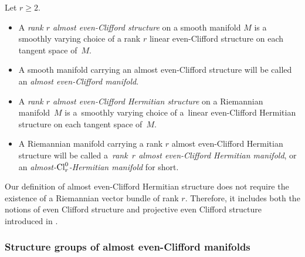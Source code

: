 \documentclass[pdftex]{sigma}
\numberwithin{equation}{section}
\begin{document}
\begin{Definition} Let $r\geq 2$.
\begin{itemize}\itemsep=0pt
 \item A {\em rank $r$ almost even-Clifford structure} on a smooth manifold $M$ is a smoothly varying choice of a rank $r$ linear even-Clif\/ford structure on each tangent space of~$M$.

\item A smooth manifold carrying an almost even-Clif\/ford structure will be called an {\em almost even-Clifford manifold}.

\item A {\em rank $r$ almost even-Clifford Hermitian structure} on a Riemannian manifold~$M$ is \linebreak a~smoothly varying choice of a~linear even-Clif\/ford Hermitian structure on each tangent space of~$M$.

\item A Riemannian manifold carrying a rank $r$ almost even-Clif\/ford Hermitian structure will be called a~{\em rank~$r$ almost even-Clifford Hermitian manifold}, or an {\em almost-${\rm Cl}_r^0$-Hermitian manifold} for short.
\end{itemize}
\end{Definition}

\begin{Remark}
Our def\/inition of almost even-Clif\/ford Hermitian structure does not require the existence of a Riemannian vector bundle of rank $r$. Therefore, it includes both the notions of even Clif\/ford structure and projective even Clif\/ford structure introduced in \cite[Def\/inition~2.2 and Remark~2.5]{Moroianu-Semmelmann}.
\end{Remark}

\subsubsection{Structure groups of almost even-Clif\/ford manifolds}\label{subsubsection: structure groups}
\end{document}
